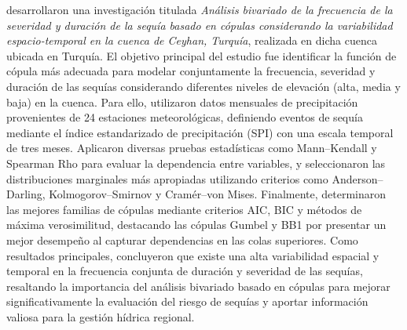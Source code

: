 \textcite{Esit2023} desarrollaron una investigación titulada \emph{Análisis bivariado de la frecuencia de la severidad y duración de la sequía basado en cópulas considerando la variabilidad espacio-temporal en la cuenca de Ceyhan, Turquía}, realizada en dicha cuenca ubicada en Turquía. El objetivo principal del estudio fue identificar la función de cópula más adecuada para modelar conjuntamente la frecuencia, severidad y duración de las sequías considerando diferentes niveles de elevación (alta, media y baja) en la cuenca. Para ello, utilizaron datos mensuales de precipitación provenientes de 24 estaciones meteorológicas, definiendo eventos de sequía mediante el índice estandarizado de precipitación (SPI) con una escala temporal de tres meses. Aplicaron diversas pruebas estadísticas como Mann–Kendall y Spearman Rho para evaluar la dependencia entre variables, y seleccionaron las distribuciones marginales más apropiadas utilizando criterios como Anderson–Darling, Kolmogorov–Smirnov y Cramér–von Mises. Finalmente, determinaron las mejores familias de cópulas mediante criterios AIC, BIC y métodos de máxima verosimilitud, destacando las cópulas Gumbel y BB1 por presentar un mejor desempeño al capturar dependencias en las colas superiores. Como resultados principales, concluyeron que existe una alta variabilidad espacial y temporal en la frecuencia conjunta de duración y severidad de las sequías, resaltando la importancia del análisis bivariado basado en cópulas para mejorar significativamente la evaluación del riesgo de sequías y aportar información valiosa para la gestión hídrica regional.

